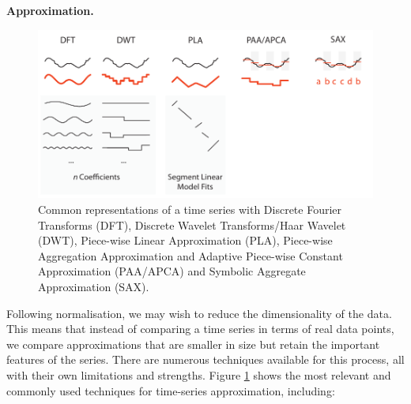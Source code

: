 \noindent\textbf{Approximation.}
%
\begin{figure}[ht!]
\centering
\includegraphics[width=.7\textwidth]{images/timeseries/approximations.pdf}
\caption{Common representations of a time series with Discrete Fourier Transforms (DFT), Discrete Wavelet Transforms/Haar Wavelet (DWT), Piece-wise Linear Approximation (PLA), Piece-wise Aggregation Approximation and Adaptive Piece-wise Constant Approximation (PAA/APCA) and Symbolic Aggregate Approximation (SAX).}
\label{fig:approximation}
\vspace{-10pt}
\end{figure}
%
Following normalisation, we may wish to reduce the dimensionality of the data. 
This means that instead of comparing a time series in terms of real data points, we compare approximations that are smaller in size but retain the important features of the series. 
There are numerous techniques available for this process, all with their own limitations and strengths. 
Figure \ref{fig:approximation} shows the most relevant and commonly used techniques for time-series approximation, including: 

